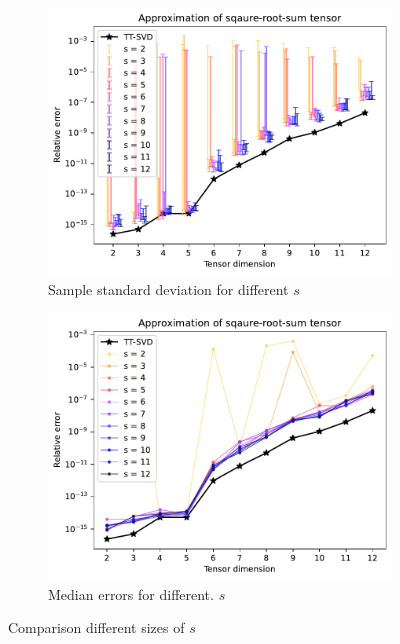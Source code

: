 \documentclass{article}
\begin{document}
\begin{figure}[H]
     \centering
     \begin{subfigure}[b]{0.8\textwidth}
         \centering
         \includegraphics[width=\textwidth]{Images/Cs_sqrt_sum_d.pdf}
         \caption{Sample standard deviation for different $s$}
         \label{fig:error bars s tt rounding}
     \end{subfigure}
     \hfill
     \begin{subfigure}[b]{0.8\textwidth}
         \centering
         \includegraphics[width=\textwidth]{Images/CsMed_sqrt_sum_d.pdf}
         \caption{Median errors for different. $s$}
         \label{fig:med errors s tt rounding}
     \end{subfigure}
     \caption{Comparison different sizes of $s$}
     \label{fig: errors srht tt rounding}
\end{figure}
\end{document}
